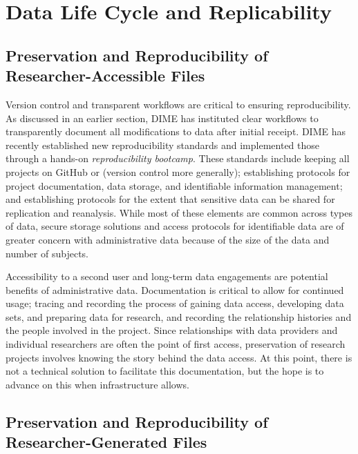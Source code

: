 \hypertarget{data-life-cycle-and-replicability-4}{%
\section{Data Life Cycle and Replicability}\label{data-life-cycle-and-replicability-4}}

\hypertarget{preservation-and-reproducibility-of-researcher-accessible-files-5}{%
\subsection{Preservation and Reproducibility of Researcher-Accessible Files}\label{preservation-and-reproducibility-of-researcher-accessible-files-5}}

Version control and transparent workflows are critical to ensuring reproducibility. As discussed in an earlier section, DIME has instituted clear workflows to transparently document all modifications to data after initial receipt. DIME has recently established new reproducibility standards and implemented those through a hands-on \emph{reproducibility bootcamp}. These standards include keeping all projects on GitHub or (version control more generally); establishing protocols for project documentation, data storage, and identifiable information management; and establishing protocols for the extent that sensitive data can be shared for replication and reanalysis. While most of these elements are common across types of data, secure storage solutions and access protocols for identifiable data are of greater concern with administrative data because of the size of the data and number of subjects.

Accessibility to a second user and long-term data engagements are potential benefits of administrative data. Documentation is critical to allow for continued usage; tracing and recording the process of gaining data access, developing data sets, and preparing data for research, and recording the relationship histories and the people involved in the project. Since relationships with data providers and individual researchers are often the point of first access, preservation of research projects involves knowing the story behind the data access. At this point, there is not a technical solution to facilitate this documentation, but the hope is to advance on this when infrastructure allows.

\hypertarget{preservation-and-reproducibility-of-researcher-generated-files-4}{%
\subsection{Preservation and Reproducibility of Researcher-Generated Files}\label{preservation-and-reproducibility-of-researcher-generated-files-4}}

